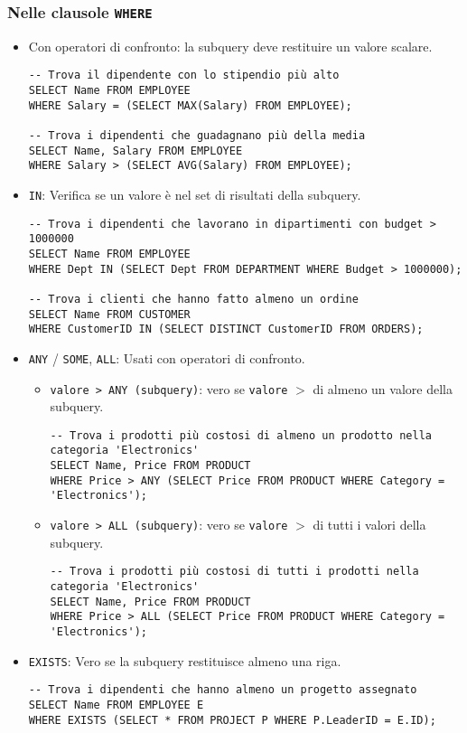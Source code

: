 \subsubsection{Nelle clausole \texttt{WHERE}}
\begin{itemize}
	\item Con operatori di confronto: la subquery deve restituire un valore scalare.
	\begin{verbatim}
-- Trova il dipendente con lo stipendio più alto
SELECT Name FROM EMPLOYEE 
WHERE Salary = (SELECT MAX(Salary) FROM EMPLOYEE);

-- Trova i dipendenti che guadagnano più della media
SELECT Name, Salary FROM EMPLOYEE 
WHERE Salary > (SELECT AVG(Salary) FROM EMPLOYEE);
	\end{verbatim}
	\item \texttt{IN}: Verifica se un valore è nel set di risultati della subquery.
	\begin{verbatim}
-- Trova i dipendenti che lavorano in dipartimenti con budget > 1000000
SELECT Name FROM EMPLOYEE 
WHERE Dept IN (SELECT Dept FROM DEPARTMENT WHERE Budget > 1000000);

-- Trova i clienti che hanno fatto almeno un ordine
SELECT Name FROM CUSTOMER 
WHERE CustomerID IN (SELECT DISTINCT CustomerID FROM ORDERS);
	\end{verbatim}
	\item \texttt{ANY} / \texttt{SOME}, \texttt{ALL}: Usati con operatori di confronto.
	\begin{itemize}
		\item \texttt{valore > ANY (subquery)}: vero se \texttt{valore} $>$ di almeno un valore della subquery.
		\begin{verbatim}
-- Trova i prodotti più costosi di almeno un prodotto nella categoria 'Electronics'
SELECT Name, Price FROM PRODUCT 
WHERE Price > ANY (SELECT Price FROM PRODUCT WHERE Category = 'Electronics');
		\end{verbatim}
		\item \texttt{valore > ALL (subquery)}: vero se \texttt{valore} $>$ di tutti i valori della subquery.
		\begin{verbatim}
-- Trova i prodotti più costosi di tutti i prodotti nella categoria 'Electronics'
SELECT Name, Price FROM PRODUCT 
WHERE Price > ALL (SELECT Price FROM PRODUCT WHERE Category = 'Electronics');
		\end{verbatim}
	\end{itemize}
	\item \texttt{EXISTS}: Vero se la subquery restituisce almeno una riga.
	\begin{verbatim}
-- Trova i dipendenti che hanno almeno un progetto assegnato
SELECT Name FROM EMPLOYEE E
WHERE EXISTS (SELECT * FROM PROJECT P WHERE P.LeaderID = E.ID);


\end{verbatim}
\end{itemize}
